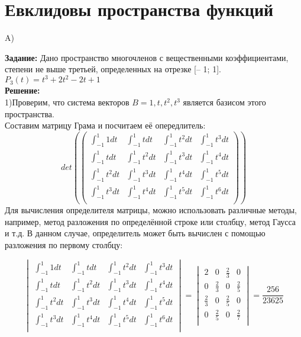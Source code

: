 \documentclass{article}
\begin{document}
\section{Евклидовы пространства функций}

     A)


\textbf{Задание:} Дано пространство многочленов с вещественными коэффициентами, степени не выше третьей,
определенных на отрезке [– 1; 1]. $P_3(t) = t^3+2t^2-2t+1$\\

\textbf{Решение:}\\


1)Проверим, что система векторов  $B= {1, t, t^2,t^3}$ является базисом этого пространства.\\
Составим матрицу Грама и посчитаем её опередлитель:\\

\begin{equation*}
    det\left(
        \begin{pmatrix}
            \int_{-1}^{1}1dt & \int_{-1}^{1}tdt & \int_{-1}^{1}t^2dt & \int_{-1}^{1}t^3dt \\
            \int_{-1}^{1}tdt & \int_{-1}^{1}t^2dt & \int_{-1}^{1}t^3dt & \int_{-1}^{1}t^4dt \\
            \int_{-1}^{1}t^2dt & \int_{-1}^{1}t^3dt & \int_{-1}^{1}t^4dt & \int_{-1}^{1}t^5dt \\
            \int_{-1}^{1}t^3dt & \int_{-1}^{1}t^4dt & \int_{-1}^{1}t^5dt & \int_{-1}^{1}t^6dt \\
        \end{pmatrix}\right)
 \end{equation*}
 Для вычисления определителя матрицы, можно использовать различные методы, например, метод разложения по определённой строке или столбцу, метод Гаусса и т.д. В данном случае, определитель может быть вычислен с помощью разложения по первому столбцу:

\[
\begin{vmatrix}
    \int_{-1}^{1}1dt & \int_{-1}^{1}tdt & \int_{-1}^{1}t^2dt & \int_{-1}^{1}t^3dt \\
    \int_{-1}^{1}tdt & \int_{-1}^{1}t^2dt & \int_{-1}^{1}t^3dt & \int_{-1}^{1}t^4dt \\
    \int_{-1}^{1}t^2dt & \int_{-1}^{1}t^3dt & \int_{-1}^{1}t^4dt & \int_{-1}^{1}t^5dt \\
    \int_{-1}^{1}t^3dt & \int_{-1}^{1}t^4dt & \int_{-1}^{1}t^5dt & \int_{-1}^{1}t^6dt \\
\end{vmatrix}
= 
\begin{vmatrix}
    2 & 0 & \frac{2}{3} & 0 \\
    0 & \frac{2}{3} & 0 &\frac{2}{5} \\
    \frac{2}{3} & 0 & \frac{2}{5} & 0 \\
    0 & \frac{2}{5} & 0 & \frac{2}{7} \\
\end{vmatrix}= \frac{256}{23625}
\]
\end{document}
